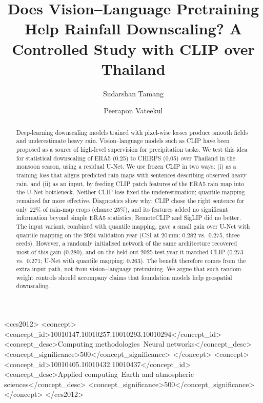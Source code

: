 \documentclass[sigconf]{acmart}
\begin{document}
\title[Does CLIP Help Rainfall Downscaling?]{Does Vision--Language
  Pretraining Help Rainfall Downscaling? A Controlled Study with CLIP
  over Thailand}

\author{Sudarshan Tamang}

\author{Peerapon Vateekul}

\renewcommand{\shortauthors}{Tamang et al.}

\begin{abstract}
  Deep-learning downscaling models trained with pixel-wise losses produce
  smooth fields and underestimate heavy rain. Vision--language models such
  as CLIP have been proposed as a source of high-level supervision for
  precipitation tasks. We test this idea for statistical downscaling of
  ERA5 (0.25\textdegree) to CHIRPS (0.05\textdegree) over Thailand in the
  monsoon season, using a residual U-Net. We use frozen CLIP in two ways:
  (i) as a training loss that aligns predicted rain maps with sentences
  describing observed heavy rain, and (ii) as an input, by feeding CLIP
  patch features of the ERA5 rain map into the U-Net bottleneck. Neither
  CLIP loss fixed the underestimation; quantile mapping remained far more
  effective. Diagnostics show why: CLIP chose the right sentence for only
  22\% of rain-map crops (chance 25\%), and its features added no
  significant information beyond simple ERA5 statistics; RemoteCLIP and
  SigLIP did no better. The input variant, combined with quantile mapping,
  gave a small gain over U-Net with quantile mapping on the 2024 validation
  year (CSI at 20\,mm: 0.282 vs.\ 0.275, three seeds). However, a randomly
  initialised network of the same architecture recovered most of this gain
  (0.280), and on the held-out 2025 test year it matched CLIP (0.273
  vs.\ 0.271; U-Net with quantile mapping: 0.263). The benefit therefore
  comes from the extra input path, not from vision--language pretraining. We argue that such random-weight
  controls should accompany claims that foundation models help geospatial
  downscaling.
\end{abstract}

\begin{CCSXML}
<ccs2012>
 <concept>
  <concept_id>10010147.10010257.10010293.10010294</concept_id>
  <concept_desc>Computing methodologies~Neural networks</concept_desc>
  <concept_significance>500</concept_significance>
 </concept>
 <concept>
  <concept_id>10010405.10010432.10010437</concept_id>
  <concept_desc>Applied computing~Earth and atmospheric sciences</concept_desc>
  <concept_significance>500</concept_significance>
 </concept>
</ccs2012>
\end{CCSXML}
\end{document}
